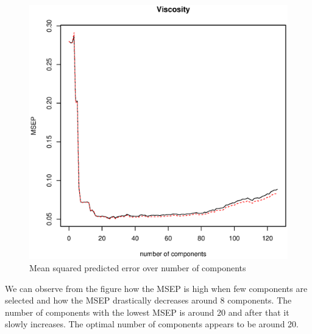 \documentclass[a4paper,12pt]{article}
\begin{document}
        \begin{figure}[H]
            \centering
            \caption{Mean squared predicted error over number of components}
            \label{fig:viscosity}
            \includegraphics[width=\textwidth]{share/A2_viscosity.eps}
        \end{figure}

	We can observe from the figure how the MSEP is high when few components are selected and how the MSEP drastically decreases around 8 components. The number of components with the lowest MSEP is around 20 and after that it slowly increases. The optimal number of components appears to be around 20. 
	
\end{document}
